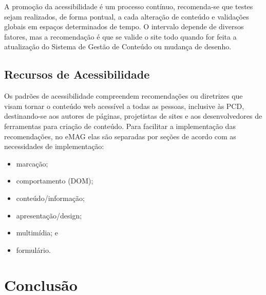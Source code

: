 \documentclass[
  12pt,
  openright,
  twoside,
  a4paper,
  english,
  french,
  spanish,
  brazil
]{abntex2}
\begin{document}
A promoção da acessibilidade é um processo contínuo, recomenda-se que testes
sejam realizados, de forma pontual, a cada alteração de conteúdo e validações
globais em espaços determinados de tempo. O intervalo depende de diversos
fatores, mas a recomendação é que se valide o site todo quando for feita a
atualização do Sistema de Gestão de Conteúdo ou mudança de desenho.

\section{Recursos de Acessibilidade}

Os padrões de acessibilidade compreendem recomendações ou diretrizes que visam
tornar o conteúdo web acessível a todas as pessoas, inclusive às PCD,
destinando-se aos autores de páginas, projetistas de sites e aos desenvolvedores
de ferramentas para criação de conteúdo. Para facilitar a implementação das
recomendações, no eMAG elas são separadas por seções de acordo com as
necessidades de implementação:

\begin{itemize}
  \item marcação;
  \item comportamento (DOM);
  \item conteúdo/informação;
  \item apresentação/design;
  \item multimídia; e
  \item formulário.
\end{itemize}


\chapter{Conclusão}

\lipsum[31-33]

\postextual



%
%

\end{document}

